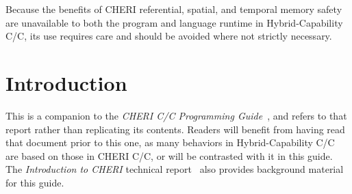 \documentclass[12pt,twoside,openright,a4paper]{article}
\newcommand{\note}[2]{{\color{blue}[ Note: #1 - #2]}}
\renewcommand{\note}[2]{\relax\ifhmode\unskip\fi}
\newcommand{\rwnote}[1]{\note{#1}{Robert W.}}
\newcommand{\nwfnote}[1]{\note{#1}{nwf}}
\newcommand*{\cpp}{\texorpdfstring{C\textsmaller[2]{\protect\nolinebreak[4]\hspace{-.05em}\raisebox{.45ex}{\textbf{++}}}}{C++}}
\newcommand*{\COrCpp}{C/\cpp{}}
\newcommand*{\purecapCOrCpp}{CHERI \COrCpp{}}
\newcommand*{\hybridCOrCpp}{Hybrid-Capability \COrCpp{}}
\begin{document}
{\nwfnote{Do you want to call out partially adapted compartmentalized programs
(possibly inclusive of programs with their own runtime systems; one could
imagine enriching JS to have a ForeignCapability type, e.g.) as another
possible example where being able to exchange capabilities might be useful
despite possibly having a non-NULL DDC?}


Because the benefits of CHERI referential, spatial, and temporal memory safety are
unavailable to both the program and language runtime in \hybridCOrCpp{},
its use requires care and should be avoided where not strictly necessary.

}

\newcommand{\reviewwarning}{
\textbf{
As \hybridCOrCpp{} remains an area of active research and development, this
report is a request for review and comments rather than a specification.
}
\rwnote{This last sentence will go away in a final version.}
}

\begin{abstract}
\abstracttext

\reviewwarning
\end{abstract}

\newpage
\setcounter{tocdepth}{2}
\tableofcontents

\newpage

\section{Introduction}

%
%
\abstracttext

This is a companion to the \textit{\purecapCOrCpp{} Programming
Guide}~\cite{UCAM-CL-TR-947}, and refers to that report rather than
replicating its contents.
Readers will benefit from having read that document prior to this one, as
many behaviors in \hybridCOrCpp{} are based on those in \purecapCOrCpp{}, or
will be contrasted with it in this guide.
The \textit{Introduction to CHERI} technical
report~\cite{UCAM-CL-TR-941} also provides background material for this
guide.
\end{document}
